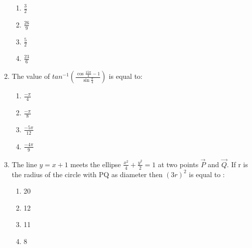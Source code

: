 \documentclass[journal]{IEEEtran}
\numberwithin{equation}{enumi}
\numberwithin{figure}{enumi}
\begin{document}
\begin{enumerate}
    \begin{multicols}{4}
    \begin{enumerate}
        \item $\frac{3}{2}$
        \item $\frac{26}{9}$
        \item $\frac{5}{2}$
        \item $\frac{23}{6}$
    \end{enumerate}
    \end{multicols}
    \bigskip
    \item The value of $tan^{-1}{\left(\frac{\cos{\frac{15\pi}{4}} - 1}{\sin{\frac{\pi}{4}}}\right)}$ is equal to: \\
    \begin{multicols}{4}
    \begin{enumerate}
        \item $\frac{-\pi}{4}$
        \item $\frac{-\pi}{8}$
        \item $\frac{-5\pi}{12}$
        \item $\frac{-4\pi}{9}$
    \end{enumerate} 
    \end{multicols}
    \bigskip
    \item  The line $y = x + 1$ meets the ellipse $\frac{x^2}{4} + \frac{y^2}{2} = 1$ at two points $\vec{P}$ and $\vec{Q}$. If r is the radius of the circle with PQ as diameter then $(3r)^2$ is equal to : \\
    \begin{multicols}{4}
    \begin{enumerate}
        \item 20
        \item 12
        \item 11
        \item 8
    \end{enumerate} 
    \end{multicols}
    \bigskip
\end{enumerate}
\end{document}
